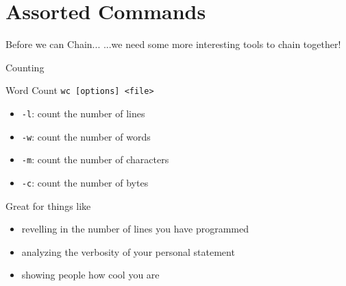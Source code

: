 \documentclass[11pt]{beamer}
\newcommand{\colbf}[1]{\textcolor{mLightBrown!77!black}{#1}}%
\begin{document}
%

%
\section{Assorted Commands}
\label{sec:assorted_commands}

\begin{frame}[fragile]{Before we can Chain...}
  ...we need some more interesting tools to chain together!
\end{frame}

\begin{frame}[fragile]{Counting}
  \begin{block}{\colbf{W}ord \colbf{C}ount}
    \texttt{wc [options] <file>}
    \begin{itemize}
      \item \texttt{-l}: count the number of lines
      \item \texttt{-w}: count the number of words
      \item \texttt{-m}: count the number of characters
      \item \texttt{-c}: count the number of bytes
    \end{itemize}
  \end{block}
  Great for things like
  \begin{itemize}[<+- | alert@+>]
    \item revelling in the number of lines you have programmed
    \item analyzing the verbosity of your personal statement
    \item showing people how cool you are
  \end{itemize}
\end{frame}
\end{document}
